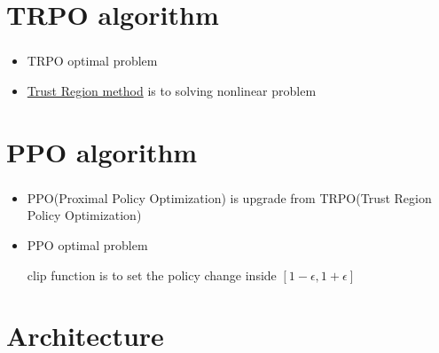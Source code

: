 \documentclass{beamer}
\begin{document}
    \section{TRPO algorithm}
    \begin{frame}
        \frametitle{\secname}

        \begin{itemize}
            \item TRPO optimal problem
            
            \item \href{https://optimization.mccormick.northwestern.edu/index.php/Trust-region_methods}{Trust Region method} is to solving nonlinear problem
            
        \end{itemize}
    \end{frame}

    \section{PPO algorithm}
    \begin{frame}
        \frametitle{\secname}

        \begin{itemize}
            \item PPO(Proximal Policy Optimization) is upgrade from TRPO(Trust Region Policy Optimization)
            \item PPO optimal problem
            
            clip function is to set the policy change inside $\left[1-\epsilon, 1+\epsilon\right]$
        \end{itemize}
    \end{frame}

    \section{Architecture}
    \begin{frame}
        \frametitle{\secname}

        \begin{figure}
            \centering
            

        \end{figure}
    \end{frame}
\end{document}
